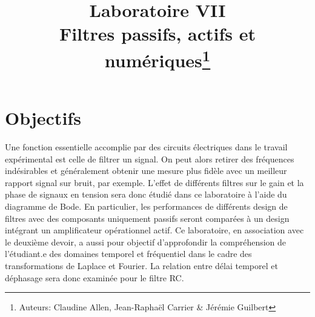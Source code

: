 \documentclass[canadien,12pt,oneside,letterpaper]{article}
\title{\textbf{Laboratoire VII}\\Filtres passifs, actifs et numériques\thanks{Auteurs: Claudine Allen, Jean-Raphaël Carrier \& Jérémie Guilbert}}
\date{}
\begin{document}
\maketitle \vspace{-2cm}

\section{Objectifs}

Une fonction essentielle accomplie par des circuits électriques dans le travail expérimental est celle de filtrer un signal. On peut alors retirer des fréquences indésirables et généralement obtenir une mesure plus fidèle avec un meilleur rapport signal sur bruit, par exemple. L’effet de différents filtres sur le gain et la phase de signaux en tension sera donc étudié dans ce laboratoire à l’aide du diagramme de Bode. En particulier, les performances de différents design de filtres avec des composants uniquement passifs seront comparées à un design intégrant un amplificateur opérationnel actif. Ce laboratoire, en association avec le deuxième devoir, a aussi pour objectif d’approfondir la compréhension de l’étudiant.e des domaines temporel et fréquentiel dans le cadre des transformations de Laplace et Fourier. La relation entre délai temporel et déphasage sera donc examinée pour le filtre RC. %
%
%
%
%
\end{document}
